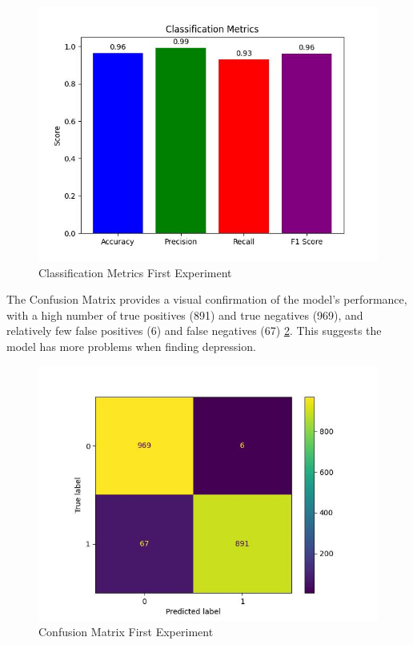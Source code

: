 \begin{figure}[htbp]
	\centering
		\includegraphics[scale=0.6]{LaTeX Bachelor Thesis Depression Signs Detection/figures/metrics/experiment1English/classificationMetrics.jpg}
	\caption{Classification Metrics First Experiment}
	\label{classificationMetricsFirstExperiment}
\end{figure}

The Confusion Matrix provides a visual confirmation of the model's performance, with a high number of true positives (891) and true negatives (969), and relatively few false positives (6) and false negatives (67) \ref{confusionMatrixFirstExperiment}. This suggests the model has more problems when finding depression.

\begin{figure}[htbp]
	\centering
		\includegraphics[scale=0.8]{LaTeX Bachelor Thesis Depression Signs Detection/figures/metrics/experiment1English/confusionMatrix.jpg}
	\caption{Confusion Matrix First Experiment}
	\label{confusionMatrixFirstExperiment}
\end{figure}

